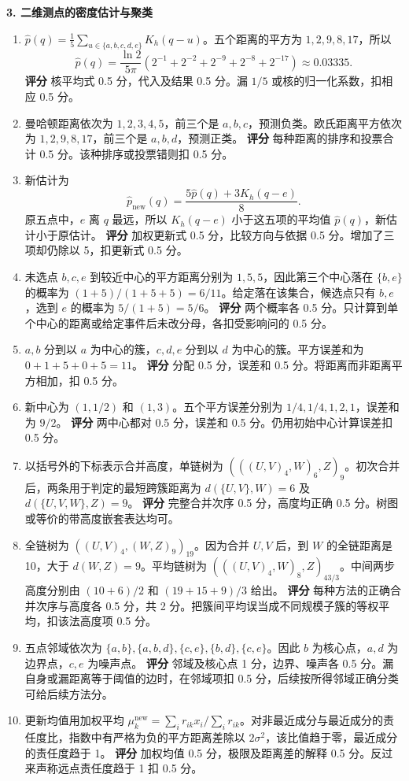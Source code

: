 \noindent\textbf{3. 二维测点的密度估计与聚类}
\begin{enumerate}[label=(\arabic*)]
\item $\widehat p(q)=\frac15\sum_{u\in\{a,b,c,d,e\}}K_h(q-u)$。五个距离的平方为 $1,2,9,8,17$，所以
\[
\widehat p(q)=\frac{\ln 2}{5\pi}
 (2^{-1}+2^{-2}+2^{-9}+2^{-8}+2^{-17})\approx0.03335.
\]
\textbf{评分} 核平均式 0.5 分，代入及结果 0.5 分。漏 $1/5$ 或核的归一化系数，扣相应 0.5 分。
\item 曼哈顿距离依次为 $1,2,3,4,5$，前三个是 $a,b,c$，预测负类。欧氏距离平方依次为 $1,2,9,8,17$，前三个是 $a,b,d$，预测正类。
\textbf{评分} 每种距离的排序和投票合计 0.5 分。该种排序或投票错则扣 0.5 分。
\item 新估计为
\[
 \widehat p_{\mathrm{new}}(q)=\frac{5\widehat p(q)+3K_h(q-e)}8.
\]
原五点中，$e$ 离 $q$ 最远，所以 $K_h(q-e)$ 小于这五项的平均值 $\widehat p(q)$，新估计小于原估计。
\textbf{评分} 加权更新式 0.5 分，比较方向与依据 0.5 分。增加了三项却仍除以 5，扣更新式 0.5 分。
\item 未选点 $b,c,e$ 到较近中心的平方距离分别为 $1,5,5$，因此第三个中心落在 $\{b,e\}$ 的概率为 $(1+5)/(1+5+5)=6/11$。给定落在该集合，候选点只有 $b,e$，选到 $e$ 的概率为 $5/(1+5)=5/6$。
\textbf{评分} 两个概率各 0.5 分。只计算到单个中心的距离或给定事件后未改分母，各扣受影响问的 0.5 分。
\item $a,b$ 分到以 $a$ 为中心的簇，$c,d,e$ 分到以 $d$ 为中心的簇。平方误差和为 $0+1+5+0+5=11$。
\textbf{评分} 分配 0.5 分，误差和 0.5 分。将距离而非距离平方相加，扣 0.5 分。
\item 新中心为 $(1,1/2)$ 和 $(1,3)$。五个平方误差分别为 $1/4,1/4,1,2,1$，误差和为 $9/2$。
\textbf{评分} 两中心都对 0.5 分，误差和 0.5 分。仍用初始中心计算误差扣 0.5 分。
\item 以括号外的下标表示合并高度，单链树为 $(((U,V)_{4},W)_{6},Z)_{9}$。初次合并后，两条用于判定的最短跨簇距离为 $d(\{U,V\},W)=6$ 及 $d(\{U,V,W\},Z)=9$。
\textbf{评分} 完整合并次序 0.5 分，高度均正确 0.5 分。树图或等价的带高度嵌套表达均可。
\item 全链树为 $((U,V)_{4},(W,Z)_{9})_{19}$。因为合并 $U,V$ 后，到 $W$ 的全链距离是 10，大于 $d(W,Z)=9$。平均链树为 $(((U,V)_{4},W)_{8},Z)_{43/3}$。中间两步高度分别由 $(10+6)/2$ 和 $(19+15+9)/3$ 给出。
\textbf{评分} 每种方法的正确合并次序与高度各 0.5 分，共 2 分。把簇间平均误当成不同规模子簇的等权平均，扣该法高度项 0.5 分。
\item 五点邻域依次为 $\{a,b\},\{a,b,d\},\{c,e\},\{b,d\},\{c,e\}$。因此 $b$ 为核心点，$a,d$ 为边界点，$c,e$ 为噪声点。
\textbf{评分} 邻域及核心点 1 分，边界、噪声各 0.5 分。漏自身或漏距离等于阈值的边时，在邻域项扣 0.5 分，后续按所得邻域正确分类可给后续方法分。
\item 更新均值用加权平均 $\mu_k^{\mathrm{new}}=\sum_i r_{ik}x_i/\sum_i r_{ik}$。对非最近成分与最近成分的责任度比，指数中有严格为负的平方距离差除以 $2\sigma^2$，该比值趋于零，最近成分的责任度趋于 1。
\textbf{评分} 加权均值 0.5 分，极限及距离差的解释 0.5 分。反过来声称远点责任度趋于 1 扣 0.5 分。
\end{enumerate}

